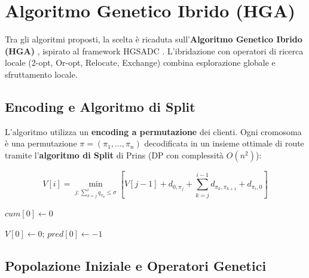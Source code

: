 \section{Algoritmo Genetico Ibrido (HGA)}

Tra gli algoritmi proposti, la scelta \`e ricaduta sull'\textbf{Algoritmo
Genetico Ibrido (HGA)} \cite{holland1975adaptation, goldberg1989genetic}, ispirato
al framework HGSADC \cite{vidal2012unified}. L'ibridazione con operatori di ricerca
locale (2-opt, Or-opt, Relocate, Exchange) \cite{lin1973effective, or1976traveling}
combina esplorazione globale e sfruttamento locale.

\subsection{Encoding e Algoritmo di Split}

L'algoritmo utilizza un \textbf{encoding a permutazione} dei clienti.
Ogni cromosoma \`e una permutazione $\pi = (\pi_1, \dots, \pi_n)$ decodificata
in un insieme ottimale di route tramite l'\textbf{algoritmo di Split} di
Prins \cite{prins2004simple} (DP con complessit\`a $O(n^2)$):

$$V[i] = \min_{j: \sum_{k=j}^{i} q_{\pi_k} \leq \sigma} \left[ V[j-1] + d_{0,\pi_j} + \sum_{k=j}^{i-1} d_{\pi_k,\pi_{k+1}} + d_{\pi_i,0} \right]$$

\begin{algorithm}[H]
\scriptsize
\caption{Split Algorithm (Prins, 2004)}
\label{alg:split}

$cum[0] \gets 0$\;

$V[0] \gets 0$; $pred[0] \gets -1$\;
\;
\end{algorithm}

\subsection{Popolazione Iniziale e Operatori Genetici}

